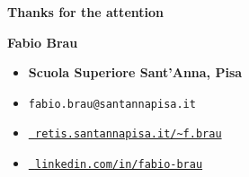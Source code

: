 \documentclass[aspectratio=169, 10pt]{beamer}
\theoremstyle{definition}
\begin{document}
{{\begin{picture}
  \end{picture}}
\begin{frame}{}
  \textbf{\Huge Thanks for the attention}\\
  \vspace{20pt}
  \begin{minipage}[h]{0.6\textwidth}
  {\large\bf Fabio Brau}
  \vspace{5pt}
  \begin{itemize}
    \item[\faUniversity] {\bf Scuola Superiore Sant'Anna, Pisa}
    \item[\Letter] \texttt{fabio.brau@santannapisa.it}
    \item[\faGlobe] \href{http://retis.santannapisa.it/~f.brau/}{\tt %
                    retis.santannapisa.it/\textasciitilde f.brau}
    \item[\faLinkedin]
      \href{https://www.linkedin.com/in/fabio-brau}{\tt%
        linkedin.com/in/fabio-brau}
  \end{itemize}
  \end{minipage}
\end{frame}
}
\end{document}
